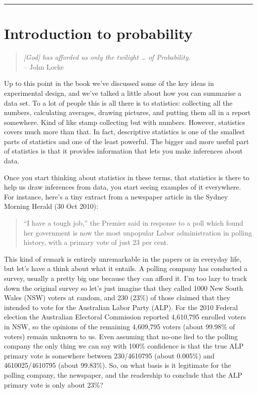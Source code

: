 \documentclass[
  letterpaper,
]{book}
\begin{document}
\begin{center}\rule{0.5\linewidth}{0.5pt}\end{center}

\hypertarget{sec-Introduction-to-probability}{%
\chapter{Introduction to
probability}\label{sec-Introduction-to-probability}}

\begin{quote}
\emph{{[}God{]} has afforded us only the twilight \ldots{} of
Probability.}\\
-- John Locke
\end{quote}

Up to this point in the book we've discussed some of the key ideas in
experimental design, and we've talked a little about how you can
summarise a data set. To a lot of people this is all there is to
statistics: collecting all the numbers, calculating averages, drawing
pictures, and putting them all in a report somewhere. Kind of like stamp
collecting but with numbers. However, statistics covers much more than
that. In fact, descriptive statistics is one of the smallest parts of
statistics and one of the least powerful. The bigger and more useful
part of statistics is that it provides information that lets you make
inferences about data.

Once you start thinking about statistics in these terms, that statistics
is there to help us draw inferences from data, you start seeing examples
of it everywhere. For instance, here's a tiny extract from a newspaper
article in the Sydney Morning Herald (30 Oct 2010):

\begin{quote}
``I have a tough job,'' the Premier said in response to a poll which
found her government is now the most unpopular Labor administration in
polling history, with a primary vote of just 23 per cent.
\end{quote}

This kind of remark is entirely unremarkable in the papers or in
everyday life, but let's have a think about what it entails. A polling
company has conducted a survey, usually a pretty big one because they
can afford it. I'm too lazy to track down the original survey so let's
just imagine that they called 1000 New South Wales (NSW) voters at
random, and 230 (23\%) of those claimed that they intended to vote for
the Australian Labor Party (ALP). For the 2010 Federal election the
Australian Electoral Commission reported 4,610,795 enrolled voters in
NSW, so the opinions of the remaining 4,609,795 voters (about 99.98\% of
voters) remain unknown to us. Even assuming that no-one lied to the
polling company the only thing we can say with 100\% confidence is that
the true ALP primary vote is somewhere between 230/4610795 (about
0.005\%) and 4610025/4610795 (about 99.83\%). So, on what basis is it
legitimate for the polling company, the newspaper, and the readership to
conclude that the ALP primary vote is only about 23\%?
\end{document}
